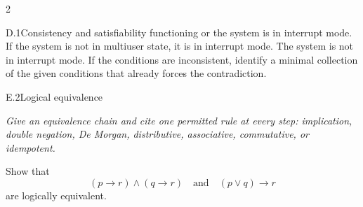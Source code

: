 \documentclass[9pt]{extarticle}
\begin{document}
\begin{multicols}{2}
\begin{CoreProblem}{D.1}{Consistency and satisfiability}
functioning or the system is in interrupt mode. If the system is not in
multiuser state, it is in interrupt mode. The system is not in interrupt mode.
If the conditions are inconsistent, identify a minimal collection of the given
conditions that already forces the contradiction.
\end{CoreProblem}
\begin{CoreProblem}{E.2}{Logical equivalence}
{\scriptsize\textit{Give an equivalence chain and cite one permitted rule at every step: implication, double negation, De Morgan, distributive, associative, commutative, or idempotent.}\par}
Show that
\[
  (p\to r)\land(q\to r)
  \quad\text{and}\quad
  (p\lor q)\to r
\]
are logically equivalent.
\end{CoreProblem}
\end{multicols}
\CoreWorkArea
\FormBreak
{}
\end{document}
